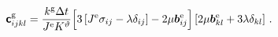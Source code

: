 \documentclass[10pt,letterpaper,oneside]{report}
\newcommand{\ten}[1]{\mbox{\boldmath $#1$}{}}
\newcommand{\tenf}[1]{\mbox{{\sffamily{\bfseries {#1}}}}}
\newcommand{\scas}[1]{\mbox{{\scriptsize{${\rm{#1}}$}}}{}}
\begin{document}
\begin{align}
\tenf{c}^{\scas{g}}_{ijkl} 
={}& \frac{ k^{\scas{g}} \Delta t}{J^{\scas{e}} K^\vartheta} \Big[ 3 \left[ J^{\scas{e}} \sigma_{ij} - \lambda \delta_{ij} \right] 
- 2 \mu \ten{b}^{\scas{e}}_{ij} \Big] 
\left[ 2 \mu \ten{b}^{\scas{e}}_{kl} + 3 \lambda \delta_{kl} \right] \, .  
\end{align}


\appendix

\end{document}
